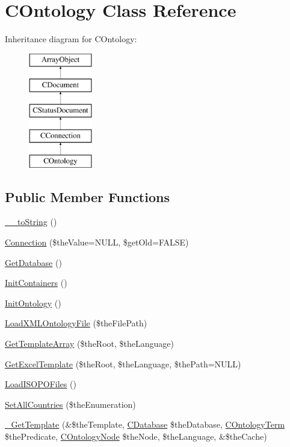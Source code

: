 \hypertarget{class_c_ontology}{\section{C\-Ontology Class Reference}
\label{class_c_ontology}
}
Inheritance diagram for C\-Ontology\-:\begin{figure}[H]
\begin{center}
\leavevmode
\includegraphics[height=5.000000cm]{class_c_ontology}
\end{center}
\end{figure}
\subsection*{Public Member Functions}
\begin{DoxyCompactItemize}
\item 
\hyperlink{class_c_ontology_a3bf6307b3353401050f4e66822d4cecf}{\-\_\-\-\_\-to\-String} ()
\item 
\hyperlink{class_c_ontology_a1c7acc74d753c47dc89d46464afc0099}{Connection} (\$the\-Value=N\-U\-L\-L, \$get\-Old=F\-A\-L\-S\-E)
\item 
\hyperlink{class_c_ontology_ae8905b152a35d927137faeb2aa1885ce}{Get\-Database} ()
\item 
\hyperlink{class_c_ontology_a305fa41da58da8239b7636e0ffdc9689}{Init\-Containers} ()
\item 
\hyperlink{class_c_ontology_a6bfd3100a83783cf1997749bf901b8df}{Init\-Ontology} ()
\item 
\hyperlink{class_c_ontology_ad9b6ebbaf592ab0543be3f63cddd025c}{Load\-X\-M\-L\-Ontology\-File} (\$the\-File\-Path)
\item 
\hyperlink{class_c_ontology_a146da417467dc53827e4b1a2e8646276}{Get\-Template\-Array} (\$the\-Root, \$the\-Language)
\item 
\hyperlink{class_c_ontology_a03d99559d6b357d64a6437a68d157c26}{Get\-Excel\-Template} (\$the\-Root, \$the\-Language, \$the\-Path=N\-U\-L\-L)
\item 
\hyperlink{class_c_ontology_a9789841620a6b75f09120223d7fd4dc8}{Load\-I\-S\-O\-P\-O\-Files} ()
\item 
\hyperlink{class_c_ontology_a85ac5a51432b48fe5c2fa81a6fae2c0a}{Set\-All\-Countries} (\$the\-Enumeration)
\item 
\hyperlink{class_c_ontology_ab00174cd1bb4ddd57457ad5dbc7db4da}{\-\_\-\-Get\-Template} (\&\$the\-Template, \hyperlink{class_c_database}{C\-Database} \$the\-Database, \hyperlink{class_c_ontology_term}{C\-Ontology\-Term} \$the\-Predicate, \hyperlink{class_c_ontology_node}{C\-Ontology\-Node} \$the\-Node, \$the\-Language, \&\$the\-Cache)
\end{DoxyCompactItemize}
